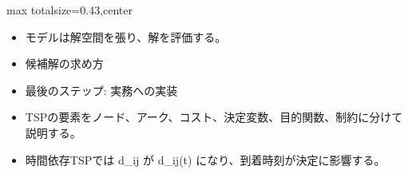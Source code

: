\clearpage
{}
\begin{minipage}[t]{0.405\textwidth}
\begin{adjustbox}{max totalsize={\textwidth}{0.43\textheight},center}
\begin{minipage}{\textwidth}\scriptsize
{}\begin{itemize}
\item モデルは解空間を張り、解を評価する。
\item 候補解の求め方
\item 最後のステップ: 実務への実装
\end{itemize}\begin{itemize}
\item TSPの要素をノード、アーク、コスト、決定変数、目的関数、制約に分けて説明する。
\item 時間依存TSPでは d\_ij が d\_ij(t) になり、到着時刻が決定に影響する。
\end{itemize}
\end{minipage}
\end{adjustbox}
\end{minipage}\hfill
